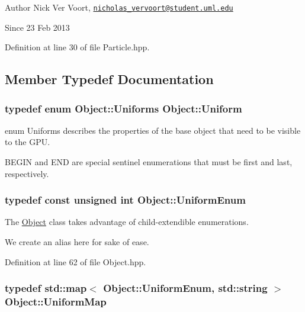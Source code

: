 \begin{DoxyAuthor}{Author}
Nick Ver Voort, \href{mailto:nicholas_vervoort@student.uml.edu}{\tt nicholas\-\_\-vervoort@student.\-uml.\-edu} 
\end{DoxyAuthor}
\begin{DoxySince}{Since}
23 Feb 2013 
\end{DoxySince}


Definition at line 30 of file Particle.\-hpp.



\subsection{Member Typedef Documentation}
\hypertarget{class_object_ae6a2969ddca87d2c54b7cb1c131a7d60}{
\subsubsection[{Uniform}]{\setlength{\rightskip}{0pt plus 5cm}typedef enum {\bf Object\-::\-Uniforms}  {\bf Object\-::\-Uniform}\hspace{0.3cm}{\ttfamily [inherited]}}}\label{class_object_ae6a2969ddca87d2c54b7cb1c131a7d60}


enum Uniforms describes the properties of the base object that need to be visible to the G\-P\-U. 

B\-E\-G\-I\-N and E\-N\-D are special sentinel enumerations that must be first and last, respectively. \hypertarget{class_object_a79b74057dbc5182b85c9c3ba8480fcf2}{
\subsubsection[{Uniform\-Enum}]{\setlength{\rightskip}{0pt plus 5cm}typedef const unsigned int {\bf Object\-::\-Uniform\-Enum}\hspace{0.3cm}{\ttfamily [inherited]}}}\label{class_object_a79b74057dbc5182b85c9c3ba8480fcf2}


The \hyperlink{class_object}{Object} class takes advantage of child-\/extendible enumerations. 

We create an alias here for sake of ease. 

Definition at line 62 of file Object.\-hpp.

\hypertarget{class_object_a6e19bd8516360bff956408cbae33b878}{
\subsubsection[{Uniform\-Map}]{\setlength{\rightskip}{0pt plus 5cm}typedef std\-::map$<$ {\bf Object\-::\-Uniform\-Enum}, std\-::string $>$ {\bf Object\-::\-Uniform\-Map}\hspace{0.3cm}{\ttfamily [inherited]}}}\label{class_object_a6e19bd8516360bff956408cbae33b878}


